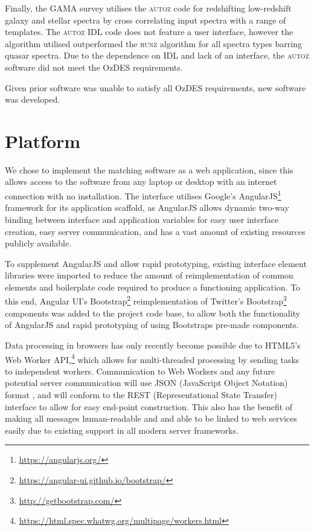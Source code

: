 \documentclass[5p]{elsarticle}
\newcommand{\runz}{\textsc{runz}}
\newcommand{\autoz}{\textsc{autoz}}
\begin{document}
Finally, the GAMA survey utilises the \autoz{} code for redshifting low-redshift galaxy and stellar spectra \citep{baldry2014galaxy} by cross correlating input spectra with a range of templates. The \autoz{} IDL code does not feature a user interface, however the algorithm utilised outperformed the \runz{} algorithm for all spectra types barring quasar spectra. Due to the dependence on IDL and lack of an interface, the \autoz{} software did not meet the OzDES requirements. 

Given prior software was unable to satisfy all OzDES requirements, new software was developed.


\section{Platform} \label{sec:platform}

We chose to implement the matching software as a web application, since this allows access to the software from any laptop or desktop with an internet connection with no installation. The interface utilises Google's AngularJS\footnote{\url{https://angularjs.org/}} framework for its application scaffold, as AngularJS allows dynamic two-way binding between interface and application variables for easy user interface creation, easy server communication, and has a vast amount of existing resources publicly available.

To supplement AngularJS and allow rapid prototyping, existing interface element libraries were imported to reduce the amount of reimplementation of common elements and boilerplate code required to produce a functioning application. To this end, Angular UI's Bootstrap\footnote{\url{https://angular-ui.github.io/bootstrap/}} reimplementation of Twitter's Bootstrap\footnote{\url{http://getbootstrap.com/}} components was added to the project code base, to allow both the functionality of AngularJS and rapid prototyping of using Bootstraps pre-made components.

Data processing in browsers has only recently become possible due to HTML5's Web Worker API,\footnote{\url{https://html.spec.whatwg.org/multipage/workers.html}} which allows for multi-threaded processing by sending tasks to independent workers. Communication to Web Workers and any future potential server communication will use JSON (JavaScript Object Notation) format \citep{bray2014javascript2}, and will conform to the REST (Representational State Transfer) interface \citep{windley11rest} to allow for easy end-point construction. This also has the benefit of making all messages human-readable and and able to be linked to web services easily due to existing support in all modern server frameworks.
\end{document}
